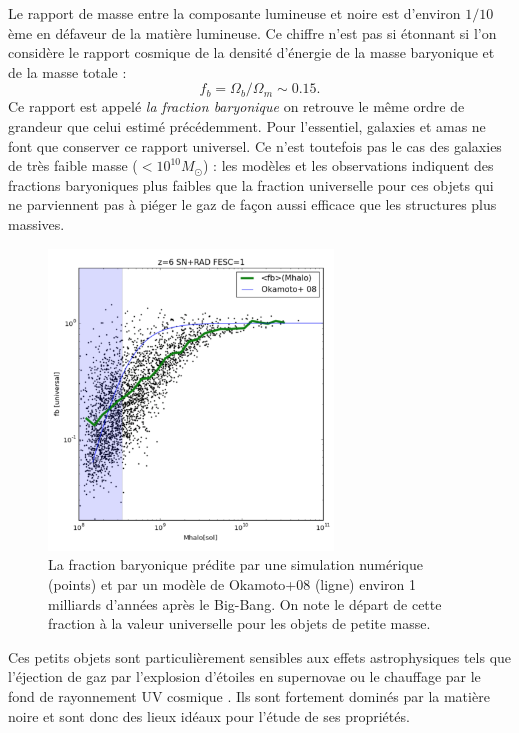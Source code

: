 Le rapport de masse entre la composante lumineuse et noire est d'environ $1/10$ème en défaveur de la matière lumineuse. Ce chiffre n'est pas si étonnant si l'on considère le rapport cosmique de la densité d'énergie de la masse baryonique et de la masse totale :
\begin{equation}
f_b=\Omega_b/\Omega_m\sim0.15.
\end{equation}
Ce rapport est appelé \textit{la fraction baryonique} on retrouve le même ordre de grandeur que celui estimé précédemment. Pour l'essentiel, galaxies et amas ne font que conserver ce rapport universel. Ce n'est toutefois pas le cas des galaxies de très faible masse ($<10^{10} M_\odot$) : les modèles et les observations indiquent des fractions baryoniques plus faibles que la fraction universelle pour ces objets qui ne parviennent pas à piéger le gaz de façon aussi efficace que les structures plus massives. 
\begin{figure}[htbp]
	\centering
		\includegraphics[height=8cm]{figs/fbar.png}
	\caption[La fraction baryonique prédite par une simulation numérique]{La fraction baryonique prédite par une simulation numérique (points) et par un modèle de Okamoto+08 (ligne) environ 1 milliards d'années après le Big-Bang. On note le départ de cette fraction à la valeur universelle pour les objets de petite masse.} 
	\label{f:fbar}
\end{figure}

Ces petits objets sont particulièrement sensibles aux effets astrophysiques tels que l'éjection de gaz par l'explosion d'étoiles en supernovae ou le chauffage par le fond de rayonnement UV cosmique . Ils sont fortement dominés par la matière noire et sont donc des lieux idéaux pour l'étude de ses propriétés.

